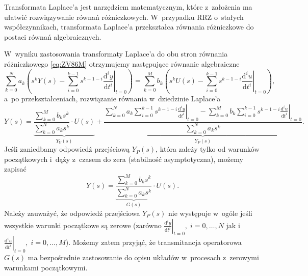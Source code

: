 \documentclass[paper=a4,DIV=12]{lpas}
\newcommand{\odn}[3]{\frac{\mathrm{d}^{#1}#2}{\mathrm{d}{#3}^{#1}}}
\begin{document}
Transformata Laplace'a jest narzędziem matematycznym, które z~założenia ma
ułatwić rozwiązywanie równań różniczkowych. W~przypadku RRZ o~stałych
współczynnikach, transformata Laplace'a przekształca równania różniczkowe do
postaci równań algebraicznych.

W~wyniku zastosowania transformaty Laplace'a do obu stron równania
różniczkowego \eqref{eq:ZV86M} otrzymujemy następujące równanie algebraiczne
\begin{equation}
  \sum_{k = 0}^{N} a_k \left( s^k Y(s) - \sum_{i = 0}^{k-1} s^{k-1-i} \left.\odn{i}{y}{t}\right|_{t=0}\right)
  =
  \sum_{k = 0}^{M} b_k \left( s^k U(s) - \sum_{i = 0}^{k-1} s^{k-1-i} \left.\odn{i}{u}{t}\right|_{t=0}\right),
  \label{eq:8P191}
\end{equation}
a~po przekształceniach, rozwiązanie równania w~dziedzinie Laplace'a
\begin{equation}
  Y\left(s\right) = \underbrace{\frac{
    \sum_{k = 0}^{M}{b_k s^k}
  }{
    \sum_{k = 0}^{N}{a_k s^k}
  } \cdot U\left(s\right)}_{Y_U(s)}
  +
  \underbrace{\frac{
    \sum_{k = 0}^{N}{ a_k \sum_{i = 0}^{k-1} s^{k-1-i} \left.\odn{i}{y}{t}\right|_{t=0} }
    -
    \sum_{k = 0}^{M}{ b_k \sum_{i = 0}^{k-1} s^{k-1-i} \left.\odn{i}{u}{t}\right|_{t=0} }
  }{
    \sum_{k = 0}^{N}{a_k s^k}
  }}_{Y_P(s)}.
  \label{eq:4QWXW}
\end{equation}
Jeśli zaniedbamy odpowiedź przejściową $Y_P\left(s\right)$, która zależy
tylko od warunków początkowych i~dąży z~czasem do zera (stabilność
asymptotyczna), możemy zapisać
\begin{equation}
  Y\left(s\right) = \underbrace{\frac{
    \sum_{k = 0}^{M}{b_k s^k}
  }{
    \sum_{k = 0}^{N}{a_k s^k}
  }}_{G(s)} \cdot U\left(s\right).
  \label{eq:2O26C}
\end{equation}
Należy zauważyć, że odpowiedź przejściowa $Y_P(s)$ nie występuje w~ogóle
jeśli wszystkie warunki początkowe są zerowe (zarówno
$\left.\odn{i}{y}{t}\right|_{t=0},\;i = 0, \dots, N$ jak
i~$\left.\odn{i}{u}{t}\right|_{t=0},\;i = 0, \dots, M$).
Możemy zatem przyjąć, że transmitancja operatorowa $G(s)$ ma bezpośrednie
zastosowanie do opisu układów w~procesach z~zerowymi warunkami początkowymi.
\end{document}
